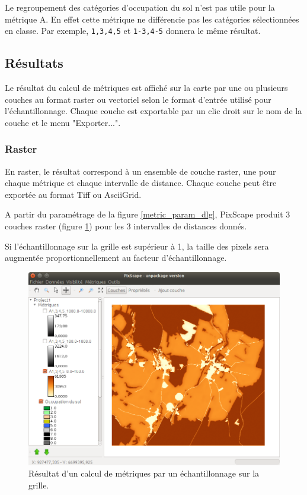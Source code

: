 \documentclass{report}
\begin{document}
Le regroupement des catégories d'occupation du sol n'est pas utile pour la métrique A. En effet cette métrique ne différencie pas les catégories sélectionnées en classe. Par exemple, \verb|1,3,4,5| et \verb|1-3,4-5| donnera le même résultat.

\subsection{Résultats}

Le résultat du calcul de métriques est affiché sur la carte par une ou plusieurs couches au format raster ou vectoriel selon le format d'entrée utilisé pour l'échantillonnage. Chaque couche est exportable par un clic droit sur le nom de la couche et le menu "Exporter...".

\subsubsection{Raster}
En raster, le résultat correspond à un ensemble de couche raster, une pour chaque métrique et chaque intervalle de distance. Chaque couche peut être exportée au format Tiff ou AsciiGrid.

A partir du paramétrage de la figure \ref{metric_param_dlg}, PixScape produit 3 couches raster (figure \ref{metric_result_rast}) pour les 3 intervalles de distances donnés.

Si l'échantillonnage sur la grille est supérieur à 1, la taille des pixels sera augmentée proportionnellement au facteur d'échantillonnage.

\begin{figure}[H]
	\includegraphics[scale=0.5]{img/metric_result_rast-fr.png} 
	\caption{Résultat d'un calcul de métriques par un échantillonnage sur la grille.}
	\label{metric_result_rast}
\end{figure}
\end{document}

